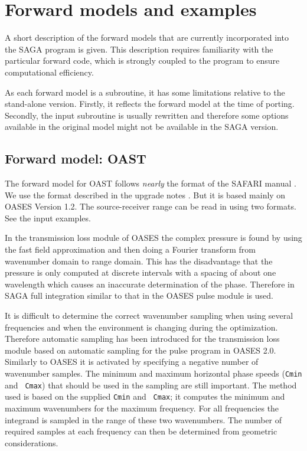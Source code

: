 \documentclass{saclantc}
\begin{document}
%
\newpage
\section{Forward models and examples}  
\label{se:forw}
A short description of the forward models that are currently
incorporated into the {\sf SAGA } program is given. This description
requires familiarity with the particular forward code, which
is strongly coupled to the program  to ensure computational
efficiency.

As each forward model is a subroutine, it has some limitations relative
to the stand-alone version. Firstly, it reflects the forward model at the
time of porting. Secondly, the input subroutine is usually rewritten
and therefore some options available in the original model might not
be available in the {\sf SAGA} version.

\subsection{Forward model: OAST }
\label{se:oast}
The forward model for  {\sf OAST} \rm follows 
{\it nearly} the format of the {\sf SAFARI}
manual \cite{hs:saf}. 
We use the format described in the upgrade notes \cite{hs:saf2}.
But it is based mainly on {\sf OASES} Version 1.2.
The source-receiver range can be read in 
using two formats. See the input examples.

In the transmission loss module of {\sf OASES} the complex pressure is found
by using the fast field approximation and then doing a Fourier transform
from wavenumber domain to range domain.
This has the disadvantage that the pressure is only computed at
discrete intervals with a spacing of about one wavelength which causes
an inaccurate determination of the phase. Therefore in
{\sf SAGA}
 full integration similar to that in the {\sf OASES} pulse module is
used.

It is difficult to determine the correct wavenumber
sampling when using several frequencies and when the environment is
changing during the optimization. Therefore  automatic
sampling has been introduced for the transmission loss module
 based on automatic sampling for the pulse program in {\sf OASES} 2.0. 
Similarly to {\sf OASES} it is activated by specifying a 
negative number of wavenumber samples.
The minimum and maximum horizontal phase speeds ({\tt Cmin} and {\tt
Cmax}) 
that should be used in the sampling are still important. 
The  method used is  based on the supplied {\tt Cmin} and {\tt
Cmax}; it computes the minimum and maximum wavenumbers  for the
maximum frequency. For all frequencies the integrand is sampled in the
range of these two wavenumbers. The number of required samples at each
frequency can then be determined from geometric considerations.
\end{document}
